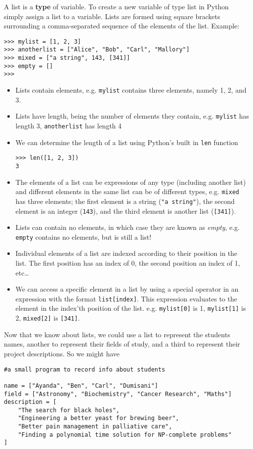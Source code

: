 A list is a \textbf{type} of variable. To create a new   variable of type list in Python simply assign a list to a variable.   Lists are formed using square brackets surrounding a comma-separated   sequence of the elements of the list.  Example:
\begin{lstlisting}
>>> mylist = [1, 2, 3]
>>> anotherlist = ["Alice", "Bob", "Carl", "Mallory"]
>>> mixed = ["a string", 143, [341]]
>>> empty = []
>>>
\end{lstlisting}
\begin{itemize}
	\item Lists contain elements, e.g. \texttt{mylist} contains three elements,    namely 1, 2, and 3.
	\item Lists have length, being the number of elements they contain,    e.g. \texttt{mylist} has length 3, \texttt{anotherlist} has length 4
	\item We can determine the length of a list using Python's built in    \texttt{len}    function
\begin{lstlisting}
>>> len([1, 2, 3])
3
\end{lstlisting}
	\item The elements of a list can be expressions of any type    (including another list) and different elements in the same list    can be of different types, e.g. \texttt{mixed} has three elements; the    first element is a string (\texttt{"a string"}), the second element is an    integer (\texttt{143}), and the third element is another list (\texttt{[341]}).
	\item Lists can contain no elements, in which case they are known as    \textit{empty}, e.g. \texttt{empty} contains no elements, but is still a list!
	\item Individual elements of a list are indexed according to their    position in the list. The first position has an index of 0, the    second position an index of 1, etc\ldots
	\item We can access a specific element in a list by using a special    operator in an expression with the format    
\texttt{list[index]}. This expression evaluates to the element    in the index'th position of the list. e.g. 
\texttt{mylist[0]}    is 1, 
\texttt{mylist[1]} is 2, 
\texttt{mixed[2]} is    \texttt{[341]}.
\end{itemize}

Now that we know about lists, we could use a list to represent the   students names, another to represent their fields of study, and a third   to represent their project descriptions. So we might have
\begin{lstlisting}
#a small program to record info about students

name = ["Ayanda", "Ben", "Carl", "Dumisani"]
field = ["Astronomy", "Biochemistry", "Cancer Research", "Maths"]
description = [
    "The search for black holes",
    "Engineering a better yeast for brewing beer",
    "Better pain management in palliative care",
    "Finding a polynomial time solution for NP-complete problems"
]
\end{lstlisting}

